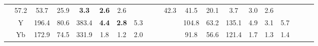 \documentclass[french,10pt]{article}
\begin{document}
\begin{landscape}
\begin{longtable}{ l  c | c c c | c c c | c c c | c c c | c c c | c c c | }
                    &                     57.2
     & {\footnotesize     53.7
    } & {\footnotesize     25.9
     }
    
    
                    &                     \textbf{ 3.3}
     & {\footnotesize     \textbf{ 2.6}
    } & {\footnotesize     2.6
     }
    
    
                    & & &

                    &                     42.3
     & {\footnotesize     41.5
    } & {\footnotesize     20.1
     }
    
    
                    &                     3.7
     & {\footnotesize     3.0
    } & {\footnotesize     2.6
     }
    
    
                    & & &

                    \\*
                        & {\small Y  }

                    &                     196.4
     & {\footnotesize     80.6
    } & {\footnotesize     383.4
     }
    
    
                    &                     \textbf{ 4.4}
     & {\footnotesize     \textbf{ 2.8}
    } & {\footnotesize     5.3
     }
    
    
                    & & &

                    &                     104.8
     & {\footnotesize     63.2
    } & {\footnotesize     135.1
     }
    
    
                    &                     4.9
     & {\footnotesize     3.1
    } & {\footnotesize     5.7
     }
    
    
                    & & &

                    \\*
                        & {\small Yb  }

                    &                     172.9
     & {\footnotesize     74.5
    } & {\footnotesize     331.9
     }
    
    
                    &                     1.8
     & {\footnotesize     1.2
    } & {\footnotesize     2.0
     }
    
    
                    & & &

                    &                     91.8
     & {\footnotesize     56.6
    } & {\footnotesize     121.4
     }
    
    
                    &                     1.7
     & {\footnotesize     1.3
    } & {\footnotesize     1.4
     }
    

\end{longtable}
\end{landscape}
\end{document}
